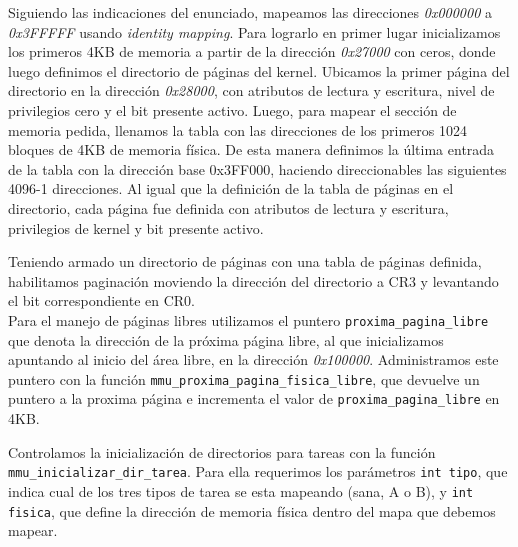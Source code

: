 Siguiendo las indicaciones del enunciado, mapeamos las direcciones \textit{0x000000} a \textit{0x3FFFFF} usando \textit{identity mapping}.
Para lograrlo en primer lugar inicializamos los primeros 4KB de memoria a partir de la dirección \textit{0x27000} con ceros, donde luego definimos el directorio de páginas del kernel.
Ubicamos la primer página del directorio en la dirección \textit{0x28000}, con atributos de lectura y escritura, nivel de privilegios cero y el bit presente activo.
Luego, para mapear el sección de memoria pedida, llenamos la tabla con las direcciones de los primeros 1024 bloques de 4KB de memoria física. 
De esta manera definimos la última entrada de la tabla con la dirección base 0x3FF000, haciendo direccionables las siguientes 4096-1 direcciones. 
Al igual que la definición de la tabla de páginas en el directorio, cada página fue definida con atributos de lectura y escritura, privilegios de kernel y bit presente activo.

Teniendo armado un directorio de páginas con una tabla de páginas definida, habilitamos paginación moviendo la dirección del directorio a CR3 y levantando el bit correspondiente en CR0.\\

Para el manejo de páginas libres utilizamos el puntero \verb|proxima_pagina_libre| que denota la dirección de la próxima página libre, al que inicializamos apuntando al inicio del área libre, en la dirección \textit{0x100000}.
Administramos este puntero con la función \verb|mmu_proxima_pagina_fisica_libre|, que devuelve un puntero a la proxima página e incrementa el valor de \verb|proxima_pagina_libre| en 4KB.

Controlamos la inicialización de directorios para tareas con la función \verb|mmu_inicializar_dir_tarea|. 
Para ella requerimos los parámetros \verb|int tipo|, que indica cual de los tres tipos de tarea se esta mapeando (sana, A o B), y \verb|int fisica|, que define la dirección de memoria física dentro del mapa que debemos mapear. 


 



